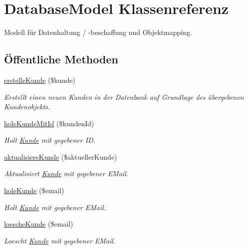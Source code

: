 \hypertarget{classDatabaseModel}{\section{\-Database\-Model \-Klassenreferenz}
\label{classDatabaseModel}
}


\-Modell für \-Datenhaltung / -\/beschaffung und \-Objektmapping.  


\subsection*{Öffentliche \-Methoden}
\begin{DoxyCompactItemize}
\item 
\hyperlink{classDatabaseModel_a94c3702cc35d4de706cd5ef39bfdfae1}{erstelle\-Kunde} (\$kunde)
\begin{DoxyCompactList}\small\item\em \-Erstellt einen neuen \-Kunden in der \-Datenbank auf \-Grundlage des übergebenen \-Kundenobjekts. \end{DoxyCompactList}\item 
\hyperlink{classDatabaseModel_aab75e7fe6ae942cd5f6096aab27ee33f}{hole\-Kunde\-Mit\-Id} (\$kunden\-Id)
\begin{DoxyCompactList}\small\item\em \-Holt \hyperlink{classKunde}{\-Kunde} mit gegebener \-I\-D. \end{DoxyCompactList}\item 
\hyperlink{classDatabaseModel_a55f3f56975923de791883e16936e891e}{aktualisiere\-Kunde} (\$aktueller\-Kunde)
\begin{DoxyCompactList}\small\item\em \-Aktualisiert \hyperlink{classKunde}{\-Kunde} mit gegebener \-E\-Mail. \end{DoxyCompactList}\item 
\hyperlink{classDatabaseModel_ae9cad447a2bcbd83b96de81321010b0f}{hole\-Kunde} (\$email)
\begin{DoxyCompactList}\small\item\em \-Holt \hyperlink{classKunde}{\-Kunde} mit gegebener \-E\-Mail. \end{DoxyCompactList}\item 
\hyperlink{classDatabaseModel_a65d29f2f888d41df4524da748e51e0dd}{loesche\-Kunde} (\$email)
\begin{DoxyCompactList}\small\item\em \-Loescht \hyperlink{classKunde}{\-Kunde} mit gegebener \-E\-Mail. \end{DoxyCompactList}\item 

\end{DoxyCompactItemize}
